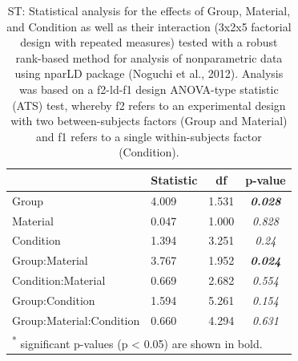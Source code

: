 \documentclass[a4paper, twoside]{templates/ociamthesis}
\begin{document}
\begin{table}

\caption{\label{tab:ST-Tab-nparLD}ST: Statistical analysis for the effects of Group, Material, and Condition as well as their interaction (3x2x5 factorial design with repeated measures) tested with a robust rank-based method for analysis of nonparametric data using nparLD package (Noguchi et al., 2012). Analysis was based on a f2-ld-f1 design ANOVA-type statistic (ATS) test, whereby f2 refers to an experimental design with two between-subjects factors (Group and Material) and f1 refers to a single within-subjects factor (Condition).}
\centering
\begin{tabular}[t]{llc>{}c}
\toprule
  & Statistic & df & p-value\\
\midrule
Group & 4.009 & 1.531 & \em{\textbf{0.028}}\\
Material & 0.047 & 1.000 & \em{0.828}\\
Condition & 1.394 & 3.251 & \em{0.24}\\
Group:Material & 3.767 & 1.952 & \em{\textbf{0.024}}\\
Condition:Material & 0.669 & 2.682 & \em{0.554}\\
Group:Condition & 1.594 & 5.261 & \em{0.154}\\
Group:Material:Condition & 0.660 & 4.294 & \em{0.631}\\
\bottomrule
\multicolumn{4}{l}{\textsuperscript{*} significant p-values (p < 0.05) are shown in bold.}\\
\end{tabular}
\end{table}

\begin{table}

\caption{\label{tab:ST-PostHocTab-nparLD}ST: Post-hoc paired comparison (Wilcoxon rank-sum test) for Group differences in z-score split by material.}
\centering
{}
\end{table}
\end{document}
